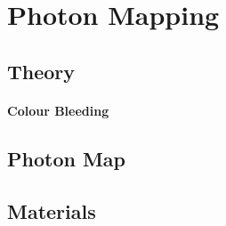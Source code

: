 \documentclass[a4paper]{article}
\begin{document}
\section{Photon Mapping}
\subsection{Theory}

\paragraph{Colour Bleeding}

\subsection{Photon Map}

\subsection{Materials}
\end{document}
